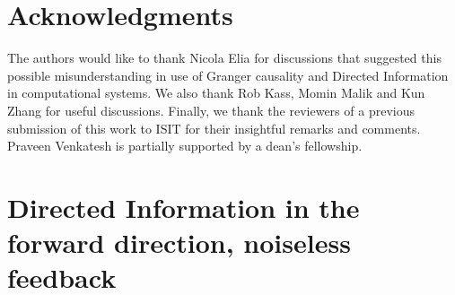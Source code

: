\documentclass[letterpaper, 10pt, conference]{ieeeconf}
\begin{document}



\section*{Acknowledgments}

The authors would like to thank Nicola Elia for discussions that suggested this possible misunderstanding in use of Granger causality and Directed Information in computational systems. We also thank Rob Kass, Momin Malik and Kun Zhang for useful discussions. Finally, we thank the reviewers of a previous submission of this work to ISIT for their insightful remarks and comments. Praveen Venkatesh is partially supported by a dean's fellowship. %




\newpage

\appendices

\section{Directed Information in the forward direction, noiseless feedback}
\label{app:dir-info-fwd-noiseless}
\end{document}
